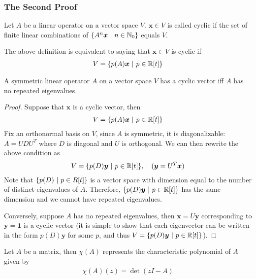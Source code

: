 \documentclass{math}
\renewcommand{\vec}[1]{\boldsymbol{#1}}
\begin{document}
\subsubsection{The Second Proof}

\begin{definition}
    Let $A$ be a linear operator on a vector space $V$.
    $\vec{x} \in V$ is called cyclic if the set of finite linear combinations of $\setc{A^n\vec{x}}{n \in \mathbb{N}_0}$ equals $V$.
\end{definition}

The above definition is equivalent to saying that $\vec{x} \in V$ is cyclic if
\begin{align*}
    V = \setc{p(A)\vec{x}}{p \in \mathbb{R}[t]}
\end{align*}

\begin{lemma}
    A symmetric linear operator $A$ on a vector space $V$ has a cyclic vector iff $A$ has no repeated eigenvalues.
\end{lemma}
\begin{proof}
    Suppose that $\vec{x}$ is a cyclic vector, then
    \begin{align*}
        V = \setc{p(A)\vec{x}}{p \in \mathbb{R}[t]}
    \end{align*}
    Fix an orthonormal basis on $V$, since $A$ is symmetric, it is diagonalizable: $A = UDU^T$ where $D$ is diagonal and $U$ is orthogonal.
    We can then rewrite the above condition as
    \begin{align*}
        V = \setc{p(D)\vec{y}}{p \in \mathbb{R}[t]}, \quad (\vec{y} = U^T\vec{x})
    \end{align*}
    Note that $\{ p(D) \ | \ p \in R[t] \}$ is a vector space with dimension equal to the number of distinct eigenvalues of $A$.
    Therefore, $\setc{p(D)\vec{y}}{p \in \mathbb{R}[t]}$ has the same dimension and we cannot have repeated eigenvalues.

    Conversely, suppose $A$ has no repeated eigenvalues, then $\vec{x} = U \vec{y}$ corresponding to $\vec{y} = \vec{1}$ is a cyclic vector
    (it is simple to show that each eigenvector can be written in the form $p(D)\vec{y}$ for some $p$, and thus $V = \setc{p(D)\vec{y}}{p \in \mathbb{R}[t]}$).
\end{proof}

\begin{definition}
    Let $A$ be a matrix, then $\chi(A)$ represents the characteristic polynomial of $A$ given by
    \begin{align*}
        \chi(A)(z) = \det(zI - A)
    \end{align*}
\end{definition}
\end{document}
